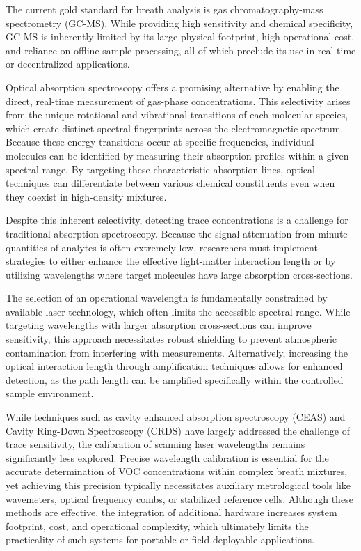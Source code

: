 \documentclass[8pt,a4paper]{report}
\begin{document}
	The current gold standard for breath analysis is gas chromatography-mass spectrometry (GC-MS). While providing high sensitivity and chemical specificity, GC-MS is inherently limited by its large physical footprint, high operational cost, and reliance on offline sample processing, all of which preclude its use in real-time or decentralized applications.
	
	Optical absorption spectroscopy offers a promising alternative by enabling the direct, real-time measurement of gas-phase concentrations. This selectivity arises from the unique rotational and vibrational transitions of each molecular species, which create distinct spectral fingerprints across the electromagnetic spectrum. Because these energy transitions occur at specific frequencies, individual molecules can be identified by measuring their absorption profiles within a given spectral range. By targeting these characteristic absorption lines, optical techniques can differentiate between various chemical constituents even when they coexist in high-density mixtures.
	
	Despite this inherent selectivity, detecting trace concentrations is a challenge for traditional absorption spectroscopy. Because the signal attenuation from minute quantities of analytes is often extremely low, researchers must implement strategies to either enhance the effective light-matter interaction length or by utilizing wavelengths where target molecules have large absorption cross-sections.
	
	The selection of an operational wavelength is fundamentally constrained by available laser technology, which often limits the accessible spectral range. While targeting wavelengths with larger absorption cross-sections can improve sensitivity, this approach necessitates robust shielding to prevent atmospheric contamination from interfering with measurements. Alternatively, increasing the optical interaction length through amplification techniques allows for enhanced detection, as the path length can be amplified specifically within the controlled sample environment.
	
	While techniques such as cavity enhanced absorption spectroscopy (CEAS) and Cavity Ring-Down Spectroscopy (CRDS) have largely addressed the challenge of trace sensitivity, the calibration of scanning laser wavelengths remains significantly less explored. Precise wavelength calibration is essential for the accurate determination of VOC concentrations within complex breath mixtures, yet achieving this precision typically necessitates auxiliary metrological tools like wavemeters, optical frequency combs, or stabilized reference cells. Although these methods are effective, the integration of additional hardware increases system footprint, cost, and operational complexity, which ultimately limits the practicality of such systems for portable or field-deployable applications.
	
\end{document}
